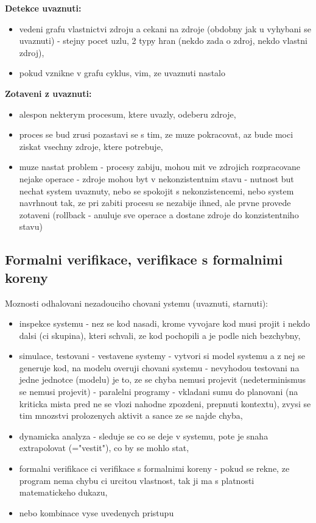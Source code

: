 \documentclass[a4paper, 11pt]{article}
\begin{document}
\textbf{Detekce uvaznuti:}
\begin{itemize}
    \item vedeni grafu vlastnictvi zdroju a cekani na zdroje (obdobny jak u vyhybani se uvaznuti) - stejny pocet uzlu, 2 typy hran (nekdo zada o zdroj, nekdo vlastni zdroj),
    \item pokud vznikne v grafu cyklus, vim, ze uvaznuti nastalo \\
\end{itemize}

\textbf{Zotaveni z uvaznuti:}
\begin{itemize}
    \item alespon nekterym procesum, ktere uvazly, odeberu zdroje,
    \item proces se bud zrusi pozastavi se s tim, ze muze pokracovat, az bude moci ziskat vsechny zdroje, ktere potrebuje,
    \item muze nastat problem - procesy zabiju, mohou mit ve zdrojich rozpracovane nejake operace - zdroje mohou byt v nekonzistentnim stavu - nutnost but nechat system uvaznuty, nebo se spokojit s nekonzistencemi, nebo system navrhnout tak, ze pri zabiti procesu se nezabije ihned, ale prvne provede zotaveni (rollback - anuluje sve operace a dostane zdroje do konzistentniho stavu) \\
\end{itemize}

\newpage

\subsection{Formalni verifikace, verifikace s formalnimi koreny}
Moznosti odhalovani nezadouciho chovani ystemu (uvaznuti, starnuti):
\begin{itemize}
    \item inspekce systemu - nez se kod nasadi, krome vyvojare kod musi projit i nekdo dalsi (ci skupina), kteri schvali, ze kod pochopili a je podle nich bezchybny,
    \item simulace, testovani - vestavene systemy -  vytvori si model systemu a z nej se generuje kod, na modelu overuji chovani systemu - nevyhodou testovani na jedne jednotce (modelu) je to, ze se chyba nemusi projevit (nedeterminismus se nemusi projevit) - paralelni programy - vkladani sumu do planovani (na kriticka mista pred ne se vlozi nahodne zpozdeni, prepnuti kontextu), zvysi se tim mnozstvi prolozenych aktivit a sance ze se najde chyba,
    \item dynamicka analyza - sleduje se co se deje v systemu, pote je snaha extrapolovat (="vestit"), co by se mohlo stat,
    \item formalni verifikace ci verifikace s formalnimi koreny - pokud se rekne, ze program nema chybu ci urcitou vlastnost, tak ji ma s platnosti matematickeho dukazu,
    \item nebo kombinace vyse uvedenych pristupu \\
\end{itemize}
\end{document}
